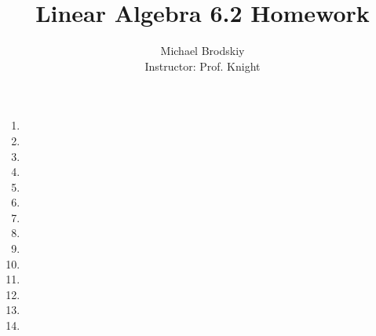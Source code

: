 \documentclass[12pt]{article}
\title{Linear Algebra 6.2 Homework}
\date{}
\author{Michael Brodskiy\\ \small Instructor: Prof. Knight}
\begin{document}
\maketitle

\begin{enumerate}

    \begin{center}
      \underline{1-27 odd, 31, 33, 39, 41, 44, 45, 47, 54, 55, 57}
    \end{center}

  \item

    \setcounter{enumi}{2}

  \item

    \setcounter{enumi}{4}

  \item

    \setcounter{enumi}{6}

  \item

    \setcounter{enumi}{8}

  \item

    \setcounter{enumi}{10}

  \item

    \setcounter{enumi}{12}

  \item

    \setcounter{enumi}{14}

  \item

    \setcounter{enumi}{16}

  \item

    \setcounter{enumi}{18}

  \item

    \setcounter{enumi}{20}

  \item

    \setcounter{enumi}{22}

  \item

    \setcounter{enumi}{24}

  \item

    \setcounter{enumi}{26}

  \item


\end{enumerate}
\end{document}
